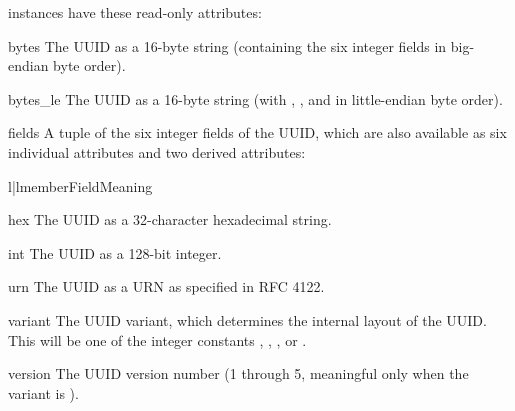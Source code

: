  instances have these read-only attributes:

\begin{memberdesc}{bytes}
The UUID as a 16-byte string (containing the six
integer fields in big-endian byte order).
\end{memberdesc}

\begin{memberdesc}{bytes_le}
The UUID as a 16-byte string (with , ,
and  in little-endian byte order).
\end{memberdesc}

\begin{memberdesc}{fields}
A tuple of the six integer fields of the UUID, which are also available
as six individual attributes and two derived attributes:

\begin{tableii}{l|l}{member}{Field}{Meaning}
\end{tableii}


\end{memberdesc}

\begin{memberdesc}{hex}
The UUID as a 32-character hexadecimal string.
\end{memberdesc}

\begin{memberdesc}{int}
The UUID as a 128-bit integer.
\end{memberdesc}

\begin{memberdesc}{urn}
The UUID as a URN as specified in RFC 4122.
\end{memberdesc}

\begin{memberdesc}{variant}
The UUID variant, which determines the internal layout of the UUID.
This will be one of the integer constants
,
, , or
.
\end{memberdesc}

\begin{memberdesc}{version}
The UUID version number (1 through 5, meaningful only
when the variant is ).
\end{memberdesc}

